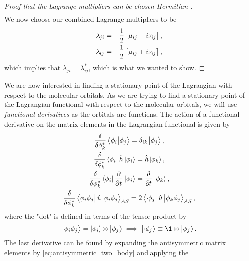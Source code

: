 \begin{proof}[%
                    Proof that the Lagrange multipliers can be chosen Hermitian%
                ]
\begin{align}
                \end{align}
                We now choose our combined Lagrange multipliers to be
                \begin{align}
                    \lambda_{ji} &=
                    -\frac{1}{2}\left[ 
                        \mu_{ij} - i\nu_{ij}
                     \right], \\
                    \lambda_{ij} &=
                    -\frac{1}{2}\left[ 
                        \mu_{ij} + i\nu_{ij}
                     \right],
                \end{align}
                which implies that $\lambda_{ji} = \lambda_{ij}^{*}$, which is
                what we wanted to show.
            \end{proof}

            We are now interested in finding a stationary point of the
            Lagrangian with respect to the molecular orbitals.
            As we are trying to find a stationary point of the Lagrangian functional
            with respect to the molecular orbitals, we will use \emph{functional
            derivatives} as the orbitals are functions.
            The action of a functional derivative on the matrix elements in the
            Lagrangian functional is given by
            \begin{gather}
                \dfd{\phi_k^{*}}\braket{\phi_i}{\phi_j}
                = \delta_{ik}\ket{\phi_j}, \\
                \dfd{\phi_k^{*}}\bra{\phi_i}\hat{h}\ket{\phi_i}
                = \hat{h}\ket{\phi_k}, \\
                \dfd{\phi_k^{*}}\bra{\phi_i}\dpd{}{t}\ket{\phi_i}
                = \dpd{}{t}\ket{\phi_k}, \\
                \dfd{\phi_k^{*}}\bra{\phi_i\phi_j}\hat{u}\ket{\phi_i\phi_j}_{AS}
                = 2\bra{\cdot\phi_j}\hat{u}\ket{\phi_k\phi_j}_{AS},
            \end{gather}
            where the "dot" is defined in terms of the tensor product by
            \begin{align}
                \ket{\phi_i\phi_j} = \ket{\phi_i}\otimes\ket{\phi_j}
                \implies \ket{\cdot\phi_j} \equiv \1 \otimes\ket{\phi_j}.
            \end{align}
            The last derivative can be found by expanding the antisymmetric matrix
            elements by \autoref{eq:antisymmetric_two_body} and applying the
